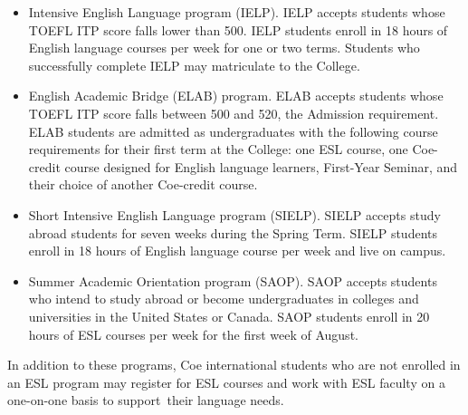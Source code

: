 \documentclass[
  letterpaper,
]{scrbook}
\providecommand{\tightlist}{%
  \setlength{\itemsep}{0pt}\setlength{\parskip}{0pt}}
\begin{document}
\begin{itemize}
\tightlist
\item
  Intensive English Language program (IELP). IELP accepts students whose
  TOEFL ITP score falls lower than 500. IELP students enroll in 18 hours
  of English language courses per week for one or two terms. Students
  who successfully complete IELP may matriculate to the College.
\item
  English Academic Bridge (ELAB) program. ELAB accepts students whose
  TOEFL ITP score falls between 500 and 520, the Admission requirement.
  ELAB students are admitted as undergraduates with the following course
  requirements for their first term at the College: one ESL course, one
  Coe-credit course designed for English language learners, First-Year
  Seminar, and their choice of another Coe-credit course.~
\item
  Short Intensive English Language program (SIELP). SIELP accepts study
  abroad students for seven weeks during the Spring Term. SIELP students
  enroll in 18 hours of English language course per week and live on
  campus.
\item
  Summer Academic Orientation program (SAOP). SAOP accepts students who
  intend to study abroad or become undergraduates in colleges and
  universities in the United States or Canada. SAOP students enroll in
  20 hours of ESL courses per week for the first week of August.
\end{itemize}

In addition to these programs, Coe international students who are not
enrolled in an ESL program may register for ESL courses and work with
ESL faculty on a one-on-one basis to support~their language needs.
\end{document}
